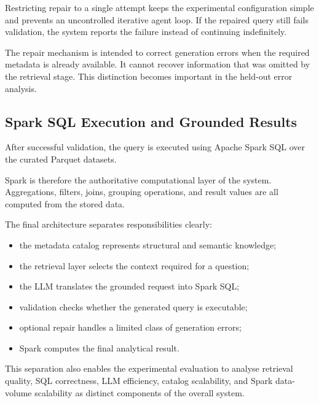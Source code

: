 Restricting repair to a single attempt keeps the experimental configuration
simple and prevents an uncontrolled iterative agent loop. If the repaired
query still fails validation, the system reports the failure instead of
continuing indefinitely.

The repair mechanism is intended to correct generation errors when the
required metadata is already available. It cannot recover information that
was omitted by the retrieval stage. This distinction becomes important in the
held-out error analysis.


\subsection{Spark SQL Execution and Grounded Results}

After successful validation, the query is executed using Apache Spark SQL over
the curated Parquet datasets.

Spark is therefore the authoritative computational layer of the system.
Aggregations, filters, joins, grouping operations, and result values are all
computed from the stored data.

The final architecture separates responsibilities clearly:

\begin{itemize}

    \item the metadata catalog represents structural and semantic knowledge;

    \item the retrieval layer selects the context required for a question;

    \item the LLM translates the grounded request into Spark SQL;

    \item validation checks whether the generated query is executable;

    \item optional repair handles a limited class of generation errors;

    \item Spark computes the final analytical result.

\end{itemize}

This separation also enables the experimental evaluation to analyse retrieval
quality, SQL correctness, LLM efficiency, catalog scalability, and Spark
data-volume scalability as distinct components of the overall system.
